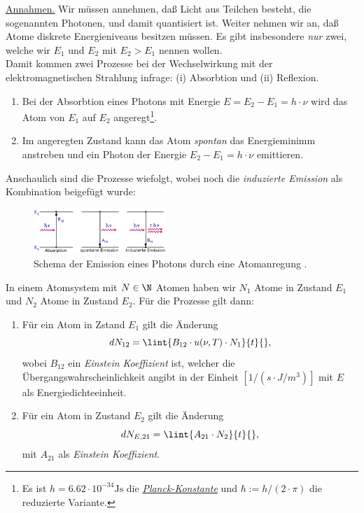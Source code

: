 \documentclass{subfiles}
\begin{document}
                \noindent\underline{Annahmen.} Wir müssen annehmen, daß Licht aus Teilchen besteht, die sogenannten Photonen, und damit quantisiert ist. Weiter nehmen wir an, daß Atome diskrete Energieniveaus besitzen müssen. Es gibt insbesondere \emph{nur} zwei, welche wir $E_1$ und $E_2$ mit $E_2>E_1$ nennen wollen. \\

                Damit kommen zwei Prozesse bei der Wechselwirkung mit der elektromagnetischen Strahlung infrage: (i) Absorbtion und (ii) Reflexion. \\

                \begin{enumerate}[label=\underline{(\roman*)}]
                    \item Bei der Absorbtion eines Photons mit Energie $E=E_2-E_1= h\cdot\nu$ wird das Atom von $E_1$ auf $E_2$ angeregt\footnote{Es ist $h=6.62\cdot 10^{-34}\si{\joule\second}$ die \href{https://de.wikipedia.org/wiki/Planck-Konstante}{\emph{Planck-Konstante}} und $\hbar:=h/(2\cdot\pi)$ die reduzierte Variante.}.
                    \item Im angeregten Zustand kann das Atom \emph{spontan} das Energieminimm anstreben und ein Photon der Energie $E_2-E_1=h\cdot\nu$ emittieren.
                \end{enumerate}

                Anschaulich sind die Prozesse wiefolgt, wobei noch die \emph{induzierte Emission} als Kombination beigefügt wurde:
                \begin{figure}
                    \centering
                    \includegraphics[width=5cm]{Bilddateien/AtomPhotonEmission.gif}
                    \caption[short]{Schema der Emission eines Photons durch eine Atomanregung \cite{uniulm:PlanckStrahlung}.}
                \end{figure}
                In einem Atomsystem mit $N\in\N$ Atomen haben wir $N_1$ Atome in Zustand $E_1$ und $N_2$ Atome in Zustand $E_2$. Für die Prozesse gilt dann:\\

                \begin{enumerate}[label=\underline{(\roman*)}]
                    \item Für ein Atom in Zstand $E_1$ gilt die Änderung 
                    \[dN_{12} =\lint{B_{12}\cdot u(\nu,T)\cdot N_1}{t}{},\]
                    wobei $B_{12}$ ein \emph{Einstein Koeffizient} ist, welcher die Übergangswahrscheinlichkeit angibt in der Einheit $[1/(s\cdot J/m^3)]$ mit $E$ als Energiedichteeinheit. 
                    \item Für ein Atom in Zustand $E_2$ gilt die Änderung
                    \[dN_{E,21} = \lint{A_{21}\cdot N_2}{t}{},\]
                    mit $A_{21}$ als \emph{Einstein Koeffizient}. 
                \end{enumerate}
\end{document}
